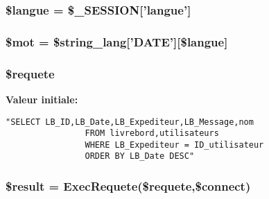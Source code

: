 \hypertarget{blocnote__lire_8php_a0}{
\subsubsection[\$langue]{\setlength{\rightskip}{0pt plus 5cm}\$langue = \$\_\-SESSION\mbox{[}'langue'\mbox{]}}}
\label{blocnote__lire_8php_a0}


\hypertarget{blocnote__lire_8php_a2}{
\subsubsection[\$mot]{\setlength{\rightskip}{0pt plus 5cm}\$mot = \$string\_\-lang\mbox{[}'DATE'\mbox{]}\mbox{[}\$langue\mbox{]}}}
\label{blocnote__lire_8php_a2}


\hypertarget{blocnote__lire_8php_a4}{
\subsubsection[\$requete]{\setlength{\rightskip}{0pt plus 5cm}\$requete}}
\label{blocnote__lire_8php_a4}


{\bf Valeur initiale:}

\footnotesize\begin{verbatim}"SELECT LB_ID,LB_Date,LB_Expediteur,LB_Message,nom
                FROM livrebord,utilisateurs
                WHERE LB_Expediteur = ID_utilisateur
                ORDER BY LB_Date DESC"
\end{verbatim}\normalsize 
\hypertarget{blocnote__lire_8php_a5}{
\subsubsection[\$result]{\setlength{\rightskip}{0pt plus 5cm}\$result = Exec\-Requete(\$requete,\$connect)}}
\label{blocnote__lire_8php_a5}


